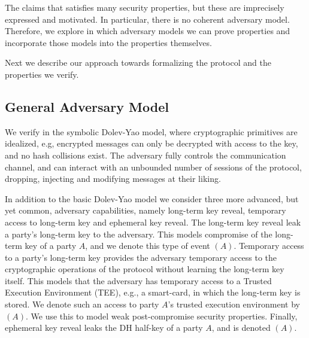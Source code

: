 The \mEdhoc{} \mSpec{} \cite{selander-lake-edhoc-01} claims
that \mEdhoc{} satisfies many security properties, but these are imprecisely
expressed and motivated.
%
In particular, there is no coherent adversary model.
%
Therefore, we explore in which adversary models we can prove properties and
incorporate those models into the properties themselves.
%

Next we describe our approach towards formalizing the \mEdhoc{} protocol and the
properties we verify.
%

\subsection{General Adversary Model}\label{sec:threat-model}
We verify \mEdhoc{} in the symbolic Dolev-Yao model, where
cryptographic primitives are idealized, e.g, encrypted messages can only be
decrypted with access to the key, and no hash collisions exist.
%
The adversary fully controls the
communication channel, and can interact with an unbounded number of sessions
of the protocol, dropping, injecting and modifying messages at their liking.
%

In addition to the basic Dolev-Yao model we consider three more advanced, but
yet common, adversary capabilities, namely long-term key reveal, temporary
access to long-term key and ephemeral key reveal.
%
The long-term key reveal leak a party's long-term key to the adversary.
%
This models compromise of the long-term key of a party $A$, and we denote this
type of event \mRevLTK$(A)$.
%
Temporary access to a party's long-term key provides the adversary temporary
access to the cryptographic operations of the protocol without learning the
long-term key itself.
%
This models that the adversary has temporary access to a Trusted Execution
Environment (TEE), e.g., a smart-card, in which the long-term key is stored.
%
We denote such an access to party $A$'s trusted execution environment by
\mTEE$(A)$.
%
We use this to model weak post-compromise security properties.
%
Finally, ephemeral key reveal leaks the DH half-key of a party $A$, and is
denoted \mRevEph$(A)$.
%


